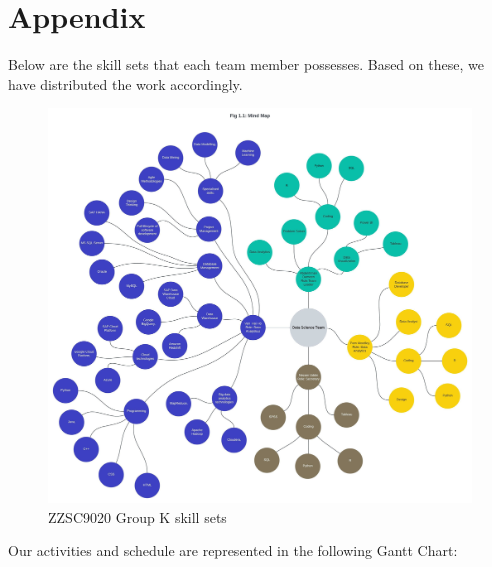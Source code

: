 \documentclass[mstat,12pt]{unswthesis}
\begin{document}
\hypertarget{appendix}{%
\chapter*{Appendix}\label{appendix}}

Below are the skill sets that each team member possesses. Based on
these, we have distributed the work accordingly.

\begin{figure}[ht]
\includegraphics[width = \textwidth, height=!]{images/ZZSC9020_Group_K_skillsets.jpeg}
\centering
\caption{ZZSC9020 Group K skill sets}
\end{figure}

Our activities and schedule are represented in the following Gantt
Chart:
\end{document}
